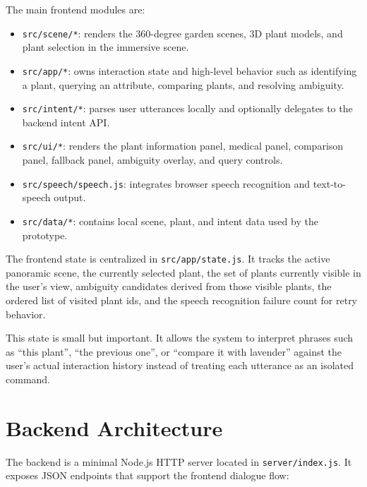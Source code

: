 \documentclass[12pt,a4paper]{article}
\begin{document}
The main frontend modules are:

\begin{itemize}
    \item \texttt{src/scene/*}: renders the 360-degree garden scenes, 3D plant
    models, and plant selection in the immersive scene.

    \item \texttt{src/app/*}: owns interaction state and high-level behavior
    such as identifying a plant, querying an attribute, comparing plants, and
    resolving ambiguity.

    \item \texttt{src/intent/*}: parses user utterances locally and optionally
    delegates to the backend intent API.

    \item \texttt{src/ui/*}: renders the plant information panel, medical panel,
    comparison panel, fallback panel, ambiguity overlay, and query controls.

    \item \texttt{src/speech/speech.js}: integrates browser speech recognition
    and text-to-speech output.

    \item \texttt{src/data/*}: contains local scene, plant, and intent data used
    by the prototype.
\end{itemize}

The frontend state is centralized in \texttt{src/app/state.js}. It tracks the
active panoramic scene, the currently selected plant, the set of plants currently
visible in the user's view, ambiguity candidates derived from those visible
plants, the ordered list of visited plant ids, and the speech recognition
failure count for retry behavior.

This state is small but important. It allows the system to interpret phrases
such as ``this plant'', ``the previous one'', or ``compare it with lavender''
against the user's actual interaction history instead of treating each
utterance as an isolated command.

\section{Backend Architecture}

The backend is a minimal Node.js HTTP server located in \texttt{server/index.js}.
It exposes JSON endpoints that support the frontend dialogue flow:
\end{document}
